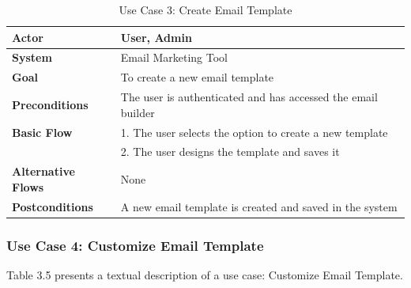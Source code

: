 \begin{table}[ht]
	\centering
	\begin{tabularx}{\textwidth}{|l|X|}
		\hline
		\textbf{Actor}             & User, Admin                                                  \\
		\hline
		\textbf{System}            & Email Marketing Tool                                         \\
		\hline
		\textbf{Goal}              & To create a new email template                               \\
		\hline
		\textbf{Preconditions}     & The user is authenticated and has accessed the email builder \\
		\hline
		\textbf{Basic Flow}        & 1. The user selects the option to create a new template      \\
		                           & 2. The user designs the template and saves it                \\
		\hline
		\textbf{Alternative Flows} & None                                                         \\
		\hline
		\textbf{Postconditions}    & A new email template is created and saved in the system      \\
		\hline
	\end{tabularx}
	\caption{Use Case 3: Create Email Template}
	\label{tab:Use Case 3 Create Email Template}
\end{table}

\subsubsection{Use Case 4: Customize Email Template}

Table 3.5 presents a textual description of a use case: Customize Email Template.

